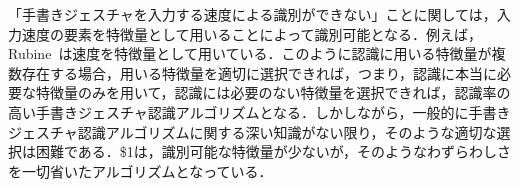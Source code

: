 「手書きジェスチャを入力する速度による識別ができない」ことに関しては，入力速度の要素を特徴量として用いることによって識別可能となる．例えば，Rubine~\cite{Rubine:1991:SGE:122718.122753}は速度を特徴量として用いている．このように認識に用いる特徴量が複数存在する場合，用いる特徴量を適切に選択できれば，つまり，認識に本当に必要な特徴量のみを用いて，認識には必要のない特徴量を選択できれば，認識率の高い手書きジェスチャ認識アルゴリズムとなる．しかしながら，一般的に手書きジェスチャ認識アルゴリズムに関する深い知識がない限り，そのような適切な選択は困難である．\$1は，識別可能な特徴量が少ないが，そのようなわずらわしさを一切省いたアルゴリズムとなっている．



